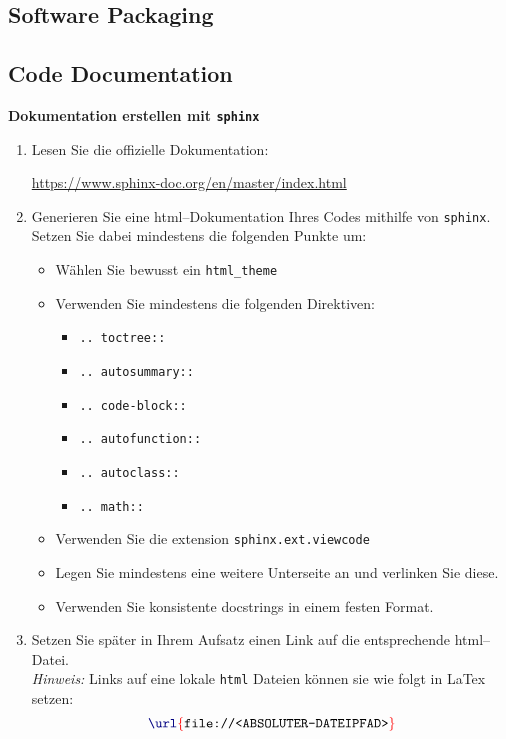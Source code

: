 \subsection{Software Packaging}

\subsection{Code Documentation}

	
 \textbf{Dokumentation erstellen mit \texttt{sphinx}}\\
	
	\begin{enumerate}
		\item Lesen Sie die offizielle	Dokumentation:		
		
			\url{https://www.sphinx-doc.org/en/master/index.html}
		
		\item Generieren Sie eine html--Dokumentation Ihres Codes mithilfe von \texttt{sphinx}. Setzen Sie dabei mindestens die folgenden Punkte um:
		\begin{itemize}
			\item Wählen Sie bewusst ein \texttt{html\_theme}
			\item Verwenden Sie mindestens die folgenden Direktiven:
			\begin{itemize}
				\item \texttt{.. toctree::}
				\item \texttt{.. autosummary::}	     
				\item \texttt{.. code-block::}
				\item \texttt{.. autofunction::}
				\item \texttt{.. autoclass::}
				\item \texttt{.. math::}
			\end{itemize}
			\item Verwenden Sie die extension \texttt{sphinx.ext.viewcode}
			\item Legen Sie mindestens eine weitere Unterseite an und verlinken Sie diese.
			\item Verwenden Sie konsistente docstrings in einem festen Format.
		\end{itemize}
		\item Setzen Sie später in Ihrem Aufsatz einen Link auf die entsprechende html--Datei. \\
		\textit{Hinweis:} Links auf eine lokale \texttt{html} Dateien können sie wie folgt in LaTex setzen: $$\latexCommand{url}{file://<ABSOLUTER-DATEIPFAD>}$$
	\end{enumerate}


